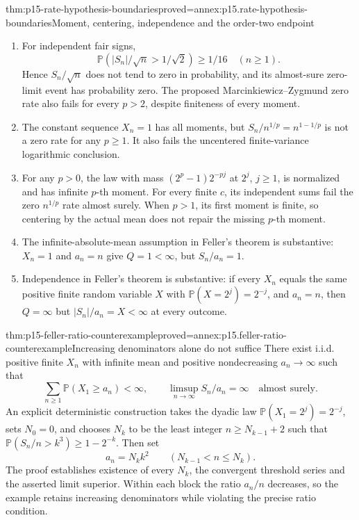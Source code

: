 \begin{hbtheorem}{thm:p15-rate-hypothesis-boundaries}{proved=annex:p15.rate-hypothesis-boundaries}{Moment, centering, independence and the order-two endpoint}
\begin{enumerate}
\item For independent fair signs,
\[
 \mathbb P(|S_n|/\sqrt n>1/\sqrt2)\geq1/16\quad(n\geq1).
\]
Hence \(S_n/\sqrt n\) does not tend to zero in probability, and
its almost-sure zero-limit event has probability zero. The proposed
Marcinkiewicz--Zygmund zero rate also fails for every \(p>2\),
despite finiteness of every moment.
\item The constant sequence \(X_n=1\) has all moments, but
\(S_n/n^{1/p}=n^{1-1/p}\) is not a zero rate for any \(p\geq1\).
It also fails the uncentered finite-variance logarithmic conclusion.
\item For any \(p>0\), the law with mass
\((2^p-1)2^{-pj}\) at \(2^j\), \(j\geq1\), is normalized and
has infinite \(p\)-th moment. For every finite \(c\), its independent
sums fail the zero \(n^{1/p}\) rate almost surely. When \(p>1\),
its first moment is finite, so centering by the actual mean does not
repair the missing \(p\)-th moment.
\item The infinite-absolute-mean assumption in Feller's theorem is
substantive: \(X_n=1\) and \(a_n=n\) give \(Q=1<\infty\),
but \(S_n/a_n=1\).
\item Independence in Feller's theorem is substantive: if every
\(X_n\) equals the same positive finite random variable \(X\) with
\(\mathbb P(X=2^j)=2^{-j}\), and \(a_n=n\), then \(Q=\infty\)
but \(|S_n|/a_n=X<\infty\) at every outcome.
\end{enumerate}
\end{hbtheorem}

\begin{hbtheorem}{thm:p15-feller-ratio-counterexample}{proved=annex:p15.feller-ratio-counterexample}{Increasing denominators alone do not suffice}
There exist i.i.d. positive finite \(X_n\) with infinite mean and
positive nondecreasing \(a_n\to\infty\) such that
\[
 \sum_{n\geq1}\mathbb P(X_1\geq a_n)<\infty,\qquad
 \limsup_{n\to\infty}S_n/a_n=\infty
                                    \quad\text{almost surely}.
\]
An explicit deterministic construction takes the dyadic law
\(\mathbb P(X_1=2^j)=2^{-j}\), sets \(N_0=0\), and chooses
\(N_k\) to be the least integer \(n\geq N_{k-1}+2\) such that
\(\mathbb P(S_n/n>k^3)\geq1-2^{-k}\). Then set
\[
 a_n=N_k k^2\qquad(N_{k-1}<n\leq N_k).
\]
The proof establishes existence of every \(N_k\), the convergent
threshold series and the asserted limit superior. Within each block
the ratio \(a_n/n\) decreases, so the example retains increasing
denominators while violating the precise ratio condition.
\end{hbtheorem}

